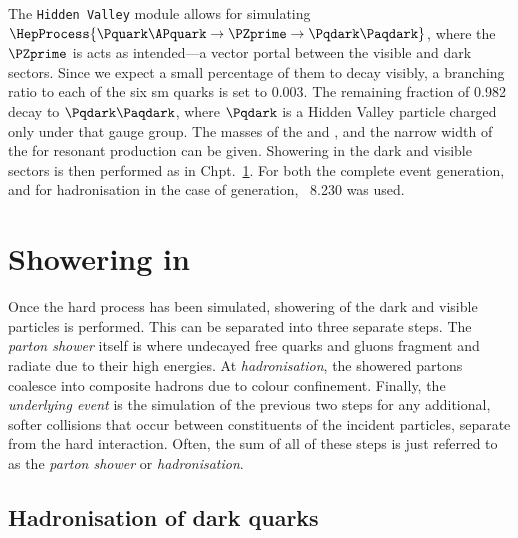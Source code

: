 The \texttt{Hidden Valley} module allows for simulating $\HepProcess{\Pquark\APquark \to \PZprime \to \Pqdark\Paqdark}$, where the $\PZprime$ is acts as intended---a vector portal between the visible and dark sectors. Since we expect a small percentage of them to decay visibly, a branching ratio to each of the six \acrshort{sm} quarks is set to 0.003. The remaining fraction of 0.982 decay to $\Pqdark\Paqdark$, where $\Pqdark$ is a Hidden Valley particle charged only under that gauge group. The masses of the \PZprime and \Pqdark, and the narrow width of the \PZprime for resonant production can be given. Showering in the dark and visible sectors is then performed as in Chpt.~\ref{sec:svj_showering_pythia}. For both the complete event generation, and for hadronisation in the case of \MADGRAPH generation, \PYTHIA~8.230 was used.




\section{Showering in \texorpdfstring{\PYTHIA}{Pythia}}
\label{sec:svj_showering_pythia}

Once the hard process has been simulated, showering of the dark and visible particles is performed. This can be separated into three separate steps. The \emph{parton shower} itself is where undecayed free quarks and gluons fragment and radiate due to their high energies. At \emph{hadronisation}, the showered partons coalesce into composite hadrons due to colour confinement. Finally, the \emph{underlying event} is the simulation of the previous two steps for any additional, softer collisions that occur between constituents of the incident particles, separate from the hard interaction. Often, the sum of all of these steps is just referred to as the \emph{parton shower} or \emph{hadronisation}.




\subsection{Hadronisation of dark quarks}
\label{subsec:svj_dark_hadronisation}

